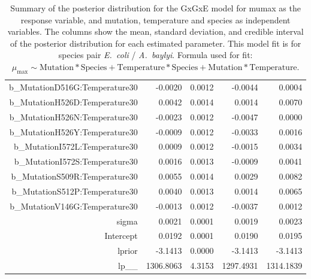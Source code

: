 \begin{table}[ht]
\begin{tabular}{rrrrr}
  b\_MutationD516G:Temperature30 & -0.0020 & 0.0012 & -0.0044 & 0.0004 \\ 
  b\_MutationH526D:Temperature30 & 0.0042 & 0.0014 & 0.0014 & 0.0070 \\ 
  b\_MutationH526N:Temperature30 & -0.0023 & 0.0012 & -0.0047 & 0.0000 \\ 
  b\_MutationH526Y:Temperature30 & -0.0009 & 0.0012 & -0.0033 & 0.0016 \\ 
  b\_MutationI572L:Temperature30 & 0.0009 & 0.0012 & -0.0015 & 0.0034 \\ 
  b\_MutationI572S:Temperature30 & 0.0016 & 0.0013 & -0.0009 & 0.0041 \\ 
  b\_MutationS509R:Temperature30 & 0.0055 & 0.0014 & 0.0029 & 0.0082 \\ 
  b\_MutationS512P:Temperature30 & 0.0040 & 0.0013 & 0.0014 & 0.0065 \\ 
  b\_MutationV146G:Temperature30 & -0.0013 & 0.0012 & -0.0037 & 0.0012 \\ 
  sigma & 0.0021 & 0.0001 & 0.0019 & 0.0023 \\ 
  Intercept & 0.0192 & 0.0001 & 0.0190 & 0.0195 \\ 
  lprior & -3.1413 & 0.0000 & -3.1413 & -3.1413 \\ 
  lp\_\_ & 1306.8063 & 4.3153 & 1297.4931 & 1314.1839 \\ 
   \hline
\end{tabular}
\endgroup
\caption{Summary of the posterior distribution for the GxGxE model for mumax as the response variable, and mutation, temperature and species as independent variables. The columns show the mean, standard deviation, and credible interval of the posterior distribution for each estimated parameter. This model fit is for species pair \textit{E.~coli} / \textit{A.~baylyi}. Formula used for fit: $\mu_{\text{max}} \sim \text{Mutation} * \text{Species} + \text{Temperature} * \text{Species} + \text{Mutation} * \text{Temperature}$.} 
\label{supptab:GxGxe_no3way_mumax}
\end{table}



